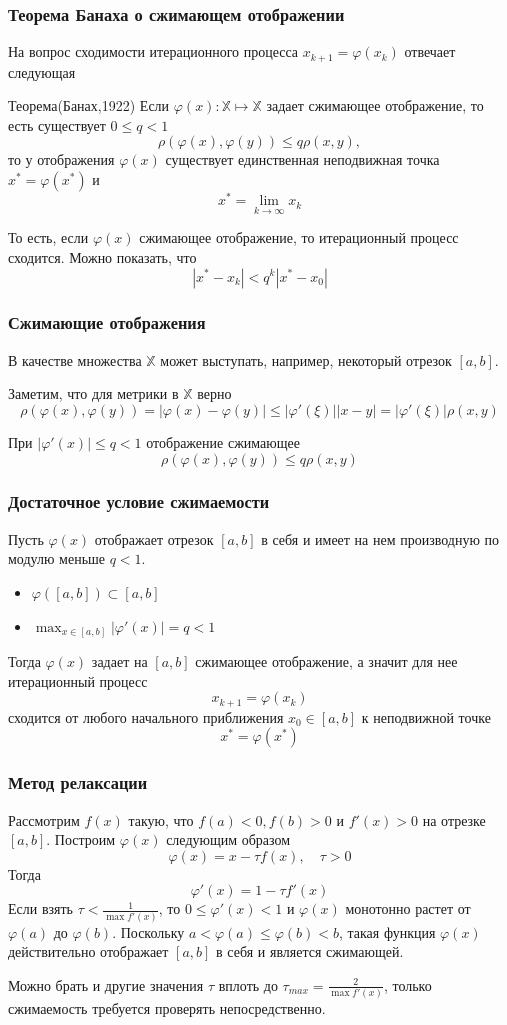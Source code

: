 \documentclass[apectratio=43,unicode]{beamer}
\begin{document}
\begin{frame}
\frametitle{Теорема Банаха о сжимающем отображении}
	На вопрос сходимости итерационного процесса $x_{k+1} = \varphi(x_k)$ отвечает следующая
	\begin{block}{Теорема(Банах,1922)}
		Если $\varphi(x): \mathbb{X} \mapsto \mathbb{X}$ задает сжимающее отображение, то есть существует $0 \leq q < 1$
		\[
		\rho(\varphi(x),\varphi(y)) \leq q \rho(x,y),
		\]
		то у отображения $\varphi(x)$ существует единственная неподвижная точка $x^* = \varphi(x^*)$ и
		\[
		x^* = \lim_{k \rightarrow \infty} x_k
		\]
	\end{block}
	То есть, если $\varphi(x)$ сжимающее отображение, то итерационный процесс сходится. Можно показать, что
	\[
	|x^* - x_k| < q^k |x^* - x_0|
	\]
\end{frame}

\begin{frame}
\frametitle{Сжимающие отображения}
	В качестве множества $\mathbb{X}$ может выступать, например, некоторый отрезок $[a,b]$.

	Заметим, что для метрики в $\mathbb{X}$ верно
	\[
	\rho(\varphi(x),\varphi(y)) = |\varphi(x)-\varphi(y)| \leq |\varphi'(\xi)| |x-y|  = |\varphi'(\xi)| \rho(x,y)
	\]

	При $|\varphi'(x)| \leq q < 1$ отображение сжимающее
	\[
	\rho(\varphi(x),\varphi(y)) \leq q \rho(x,y)
	\]
\end{frame}

\begin{frame}
\frametitle{Достаточное условие сжимаемости}
	Пусть $\varphi(x)$ отображает отрезок $[a,b]$ в себя и имеет на нем производную по модулю меньше $q < 1$.
	\begin{itemize}
		\item $\varphi([a,b]) \subset [a,b]$
		\item $\displaystyle \max_{x \in [a,b]}|\varphi'(x)| = q < 1$
	\end{itemize}
	Тогда $\varphi(x)$ задает на $[a,b]$ сжимающее отображение, а значит для нее итерационный процесс
	\[
	x_{k+1} = \varphi(x_k)
	\]
	сходится от любого начального приближения $x_0 \in [a,b]$ к неподвижной точке
	\[
	x^* = \varphi(x^*)
	\]
\end{frame}

\begin{frame}
\frametitle{Метод релаксации}
	Рассмотрим $f(x)$ такую, что $f(a) < 0, f(b) > 0$ и $f'(x) > 0$ на отрезке $[a,b]$.
	Построим $\varphi(x)$ следующим образом
	\[
	\varphi(x) = x - \tau f(x),\quad \tau > 0
	\]
	Тогда
	\[
	\varphi'(x) = 1 - \tau f'(x)
	\]
	Если взять $\tau < \frac{1}{\max f'(x)}$, то $0 \leq \varphi'(x) < 1$ и $\varphi(x)$ монотонно растет
	от $\varphi(a)$ до $\varphi(b)$. Поскольку $a < \varphi(a) \leq \varphi(b) < b$, такая функция $\varphi(x)$
	действительно отображает $[a,b]$ в себя и является сжимающей.

	Можно брать и другие значения $\tau$ вплоть до $\tau_{max} = \frac{2}{\max f'(x)}$, только сжимаемость требуется проверять
	непосредственно.
\end{frame}
\end{document}
